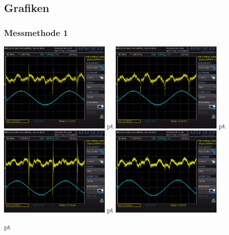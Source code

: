 \documentclass[12pt]{article}
\begin{document}
\subsection{Grafiken}
\subsubsection{Messmethode 1}

\begin{minipage}[h!]{\textwidth}
	\centering
	\includegraphics[width=0.4\textwidth]{data/HHH01.PNG} pt
	\includegraphics[width=0.4\textwidth]{data/HHH02.PNG} pt
	\includegraphics[width=0.4\textwidth]{data/HHH03.PNG} pt
	\includegraphics[width=0.4\textwidth]{data/HHH04.PNG}
\end{minipage}
 pt
\end{document}
